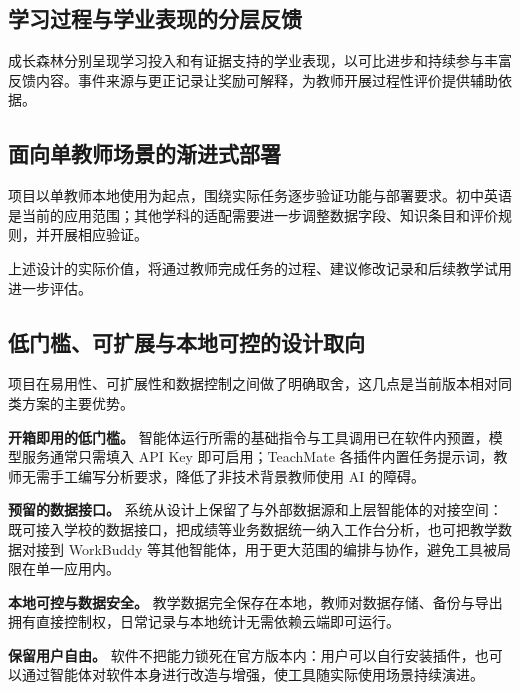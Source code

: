 \documentclass[11pt,a4paper,fontset=none]{ctexart}
\begin{document}
\subsection{学习过程与学业表现的分层反馈}

成长森林分别呈现学习投入和有证据支持的学业表现，以可比进步和持续参与丰富反馈内容。事件来源与更正记录让奖励可解释，为教师开展过程性评价提供辅助依据。

\subsection{面向单教师场景的渐进式部署}

项目以单教师本地使用为起点，围绕实际任务逐步验证功能与部署要求。初中英语是当前的应用范围；其他学科的适配需要进一步调整数据字段、知识条目和评价规则，并开展相应验证。

上述设计的实际价值，将通过教师完成任务的过程、建议修改记录和后续教学试用进一步评估。

\subsection{低门槛、可扩展与本地可控的设计取向}

项目在易用性、可扩展性和数据控制之间做了明确取舍，这几点是当前版本相对同类方案的主要优势。

\textbf{开箱即用的低门槛。} 智能体运行所需的基础指令与工具调用已在软件内预置，模型服务通常只需填入 API Key 即可启用；TeachMate 各插件内置任务提示词，教师无需手工编写分析要求，降低了非技术背景教师使用 AI 的障碍。

\textbf{预留的数据接口。} 系统从设计上保留了与外部数据源和上层智能体的对接空间：既可接入学校的数据接口，把成绩等业务数据统一纳入工作台分析，也可把教学数据对接到 WorkBuddy 等其他智能体，用于更大范围的编排与协作，避免工具被局限在单一应用内。

\textbf{本地可控与数据安全。} 教学数据完全保存在本地，教师对数据存储、备份与导出拥有直接控制权，日常记录与本地统计无需依赖云端即可运行。

\textbf{保留用户自由。} 软件不把能力锁死在官方版本内：用户可以自行安装插件，也可以通过智能体对软件本身进行改造与增强，使工具随实际使用场景持续演进。
\end{document}
